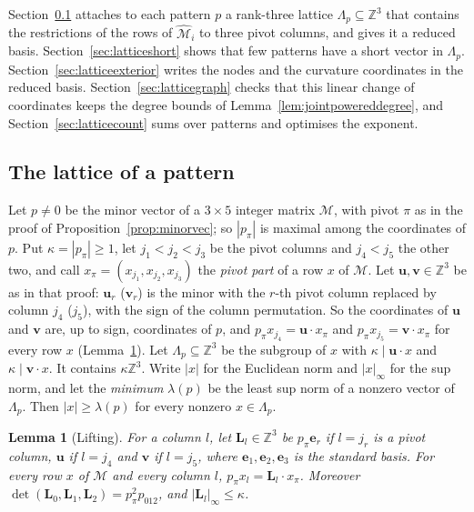 \documentclass[11pt]{article}
\newtheorem{lemma}[theorem]{Lemma}
\theoremstyle{definition}
\theoremstyle{remark}
\begin{document}
Section~\ref{sec:latticepattern} attaches to each pattern $p$ a rank-three lattice
$\Lambda_p\subseteq\mathbb Z^3$ that contains the restrictions of the rows of
$\widehat{\mathcal M}_i$ to three pivot columns, and gives it a reduced basis. Section~\ref{sec:latticeshort} shows
that few patterns have a short vector in $\Lambda_p$. Section~\ref{sec:latticeexterior} writes
the nodes and the curvature coordinates in the reduced basis.
Section~\ref{sec:latticegraph} checks that this linear change of coordinates keeps the degree
bounds of Lemma~\ref{lem:jointpowereddegree}, and Section~\ref{sec:latticecount} sums over
patterns and optimises the exponent.

\subsection{The lattice of a pattern}\label{sec:latticepattern}
Let $p\ne0$ be the minor vector of a $3\times5$ integer matrix $\mathcal M$, with pivot $\pi$
as in the proof of Proposition~\ref{prop:minorvec}; so $|p_\pi|$ is maximal among the
coordinates of $p$. Put $\kappa=|p_\pi|\ge1$, let $j_1<j_2<j_3$ be the pivot columns and
$j_4<j_5$ the other two, and call $x_\pi=(x_{j_1},x_{j_2},x_{j_3})$ the \emph{pivot part} of a
row $x$ of $\mathcal M$. Let $\mathbf u,\mathbf v\in\mathbb Z^3$ be as in that proof: $\mathbf u_r$ ($\mathbf v_r$) is the minor
with the $r$-th pivot column replaced by column $j_4$ ($j_5$), with the sign of the column
permutation. So the coordinates of $\mathbf u$ and $\mathbf v$ are, up to sign, coordinates of $p$, and
$p_\pi x_{j_4}=\mathbf u\cdot x_\pi$ and $p_\pi x_{j_5}=\mathbf v\cdot x_\pi$ for every row $x$
(Lemma~\ref{lem:lift}). Let $\Lambda_p\subseteq\mathbb Z^3$ be the subgroup of $x$ with
$\kappa\mid \mathbf u\cdot x$ and $\kappa\mid \mathbf v\cdot x$. It contains $\kappa\mathbb Z^3$. Write $|x|$
for the Euclidean norm and $|x|_\infty$ for the sup norm, and let the \emph{minimum}
$\lambda(p)$ be the least sup norm of a nonzero vector of $\Lambda_p$. Then
$|x|\ge\lambda(p)$ for every nonzero $x\in\Lambda_p$.

\begin{lemma}[Lifting]\label{lem:lift}
For a column $l$, let $\mathbf L_l\in\mathbb Z^3$ be $p_\pi\mathbf e_r$ if $l=j_r$ is a pivot column,
$\mathbf u$ if $l=j_4$ and $\mathbf v$ if $l=j_5$, where $\mathbf e_1,\mathbf e_2,\mathbf e_3$ is the standard
basis. For every row $x$ of $\mathcal M$ and every column $l$, $p_\pi x_l=\mathbf L_l\cdot x_\pi$.
Moreover $\det(\mathbf L_0,\mathbf L_1,\mathbf L_2)=p_\pi^2p_{012}$,
and $|\mathbf L_l|_\infty\le\kappa$.
\end{lemma}
\end{document}
